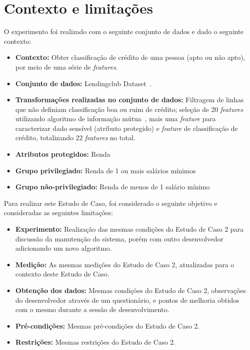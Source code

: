 \documentclass[portugues]{ic-tese}
\begin{document}
\section{Contexto e limitações}

O experimento foi realizado com o seguinte conjunto de dados e dado o seguinte contexto:

\begin{itemize}
\item \textbf{Contexto:} Obter classificação de crédito de uma pessoa (apto ou não apto), por meio de uma série de \textit{features}.

\item \textbf{Conjunto de dados:} Lendingclub Dataset~\citep{lendingclub_2022}.

\item \textbf{Transformações realizadas no conjunto de dados:} Filtragem de linhas que não definiam classificação boa ou ruim de crédito; seleção de 20 \textit{features} utilizando algoritmo de informação mútua~\citep{Ross_2014}, mais uma \textit{feature} para caracterizar dado sensível (atributo protegido) e \textit{feature} de classificação de crédito, totalizando 22 \textit{features} no total.

\item \textbf{Atributos protegidos:} Renda

\item \textbf{Grupo privilegiado:} Renda de 1 ou mais salários mínimos

\item \textbf{Grupo não-privilegiado:} Renda de menos de 1 salário mínimo

\end{itemize}

Para realizar este Estudo de Caso, foi considerado o seguinte objetivo e consideradas as seguintes limitações:

\begin{itemize}
\item \textbf{Experimento:} Realização das mesmas condições do Estudo de Caso 2 para discussão da manutenção do sistema, porém com outro desenvolvedor adicionando um novo algoritmo.

\item \textbf{Medição:} As mesmas medições do Estudo de Caso 2, atualizadas para o contexto deste Estudo de Caso.

\item \textbf{Obtenção dos dados:} Mesmas condições do Estudo de Caso 2, observações do desenvolvedor através de um questionário, e pontos de melhoria obtidos com o mesmo durante a sessão de desenvolvimento.

\item \textbf{Pré-condições:} Mesmas pré-condições do Estudo de Caso 2.

\item \textbf{Restrições:} Mesmas restrições do Estudo de Caso 2.
\end{itemize}
\end{document}

